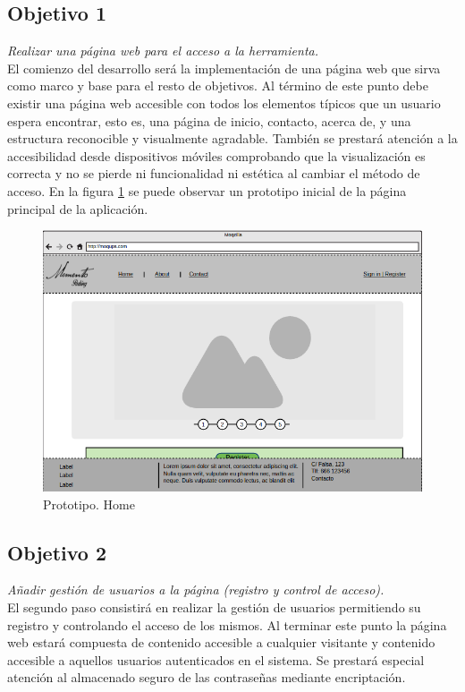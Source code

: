 \subsection{Objetivo 1}
\emph{Realizar una página web para el acceso a la herramienta.}\\
El comienzo del desarrollo será la implementación de una página web que sirva como marco y base para el resto de objetivos. Al término de este punto debe existir una página web accesible con todos los elementos típicos que un usuario espera encontrar, esto es, una página de inicio, contacto, acerca de, y una estructura reconocible y visualmente agradable. También se prestará atención a la accesibilidad desde dispositivos móviles comprobando que la visualización es correcta y no se pierde ni funcionalidad ni estética al cambiar el método de acceso. En la figura \ref{fig:prototipo_home} se puede observar un prototipo inicial de la página principal de la aplicación.

\begin{figure}[h!btp]
	\centering
	\includegraphics[scale=0.5, fbox={\fboxrule} 4mm]{images/02-objetivos/03-prototipo_home.png}
	\caption{Prototipo. Home}
	\label{fig:prototipo_home}
\end{figure}

\subsection{Objetivo 2}
\emph{Añadir gestión de usuarios a la página (registro y control de acceso).}\\
El segundo paso consistirá en realizar la gestión de usuarios permitiendo su registro y controlando el acceso de los mismos. Al terminar este punto la página web estará compuesta de contenido accesible a cualquier visitante y contenido accesible a aquellos usuarios autenticados en el sistema. Se prestará especial atención al almacenado seguro de las contraseñas mediante encriptación.

